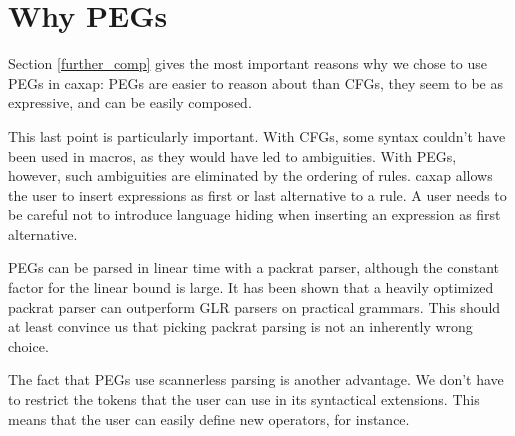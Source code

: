 \section{Why PEGs}

Section \ref{further_comp} gives the most important reasons why we chose to use
PEGs in caxap: PEGs are easier to reason about than CFGs, they seem to be as
expressive, and can be easily composed.

This last point is particularly important. With CFGs, some syntax couldn't have
been used in macros, as they would have led to ambiguities. With PEGs, however,
such ambiguities are eliminated by the ordering of rules. caxap allows the user
to insert expressions as first or last alternative to a rule. A user needs to be
careful not to introduce language hiding when inserting an expression as first
alternative.

PEGs can be parsed in linear time with a packrat parser, although the constant
factor for the linear bound is large. It has been shown that a heavily optimized
packrat parser can outperform GLR parsers on practical grammars.
\cite{grimm2006} This should at least convince us that picking packrat parsing
is not an inherently wrong choice.

The fact that PEGs use scannerless parsing is another advantage. We don't have
to restrict the tokens that the user can use in its syntactical extensions. This
means that the user can easily define new operators, for instance.
